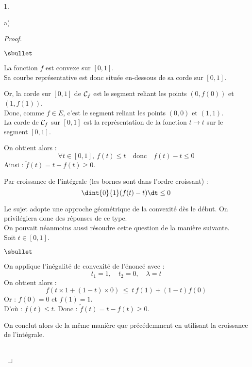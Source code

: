 \documentclass[11pt]{article}%
\begin{document}
\begin{noliste}{1.}
\begin{noliste}{a)}
  \begin{proof}~
    \begin{noliste}{$\sbullet$}
	\item La fonction $f$ est convexe sur $[0,1]$.\\ 
	Sa courbe 
	représentative est donc située en-dessous de sa corde sur 
	$[0,1]$.
	\item Or, la corde sur $[0,1]$ de ${\cal C}_f$ est le segment 
	reliant
	les points $(0,f(0))$ et $(1,f(1))$.\\
	Donc, comme $f\in E$, c'est le segment reliant les points 
	$(0,0)$ et $(1,1)$.\\
	La corde de ${\cal C}_f$ sur $[0,1]$ est la représentation de 
	la fonction
	$t\mapsto t$ sur le segment $[0,1]$.
	
	
	\newpage
	
	
	\item On obtient alors :
	\[
	  \forall t\in [0,1], \ f(t) \leq t \quad \text{donc} \quad 
	  f(t) -t \leq 0
	\]
	Ainsi : $\tilde{f}(t) = t-f(t) \geq 0$.
	\item Par croissance de l'intégrale (les bornes sont dans 
	l'ordre croissant) :
	\[
	  \dint{0}{1} (f(t)-t) \dt \leq 0
	\]
      \end{noliste}
    
    \begin{remark}
      Le sujet adopte une approche géométrique de la convexité dès le
      début. On privilégiera donc des réponses de ce type.\\
      On pouvait néanmoins aussi résoudre cette question de la manière 
      suivante.\\
      Soit $t\in [0,1]$.
      \begin{noliste}{$\sbullet$}
	\item On applique l'inégalité de convexité de l'énoncé avec :
	\[
	  t_1=1, \quad t_2=0, \quad \lambda = t
	\]
	On obtient alors :
	\[
	  f(t\times 1 + (1-t) \times 0) \ \leq \ t \, f(1) + (1-t) f(0)
	\]
	Or : $f(0)=0$ et $f(1)=1$. \\
	D'où :
	$
	  f(t) \leq t$. Donc : $\tilde{f}(t)=t-f(t) 
	  \geq 0.
	$
	\item On conclut alors de la même manière que précédemment en 
	utilisant la croissance de l'intégrale.
      \end{noliste}
    \end{remark}~\\[-1.4cm]
  \end{proof}


\end{noliste}
\end{noliste}
\end{document}
